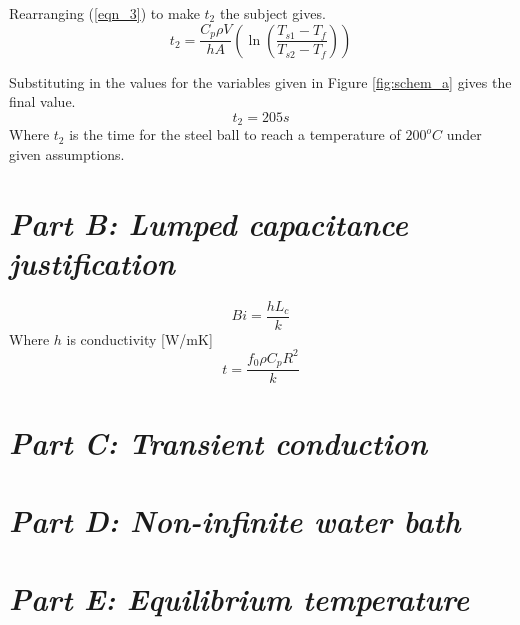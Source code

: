 \documentclass[11pt]{article}
\begin{document}
Rearranging (\ref{eqn_3}) to make $t_{2}$ the subject gives.
\begin{equation}\label{key}
	t_{2} = \frac{C_{p}\rho V}{hA}(\ln{(\frac{T_{s1}-T_{f}}{T_{s2}-T_{f}})})
\end{equation}

Substituting in the values for the variables given in Figure \ref{fig:schem_a} gives the final value.
\boldmath
\begin{equation}\label{key}
	t_2 = 205 s
\end{equation}
\unboldmath
Where $t_2$ is the time for the steel ball to reach a temperature of $200^{o}C$ under given assumptions.

\section{\emph{Part B: Lumped capacitance justification}}
\begin{equation}
	Bi = \frac{h L_{c}}{k}
\end{equation}
Where $h$ is conductivity [W/mK]
\begin{equation}
	t=\frac{f_{0} \rho C_{p} R^{2}}{k}
\end{equation}
\section{\emph{Part C: Transient conduction}}

\section{\emph{Part D: Non-infinite water bath}}

\section{\emph{Part E: Equilibrium temperature}}
\end{document}
